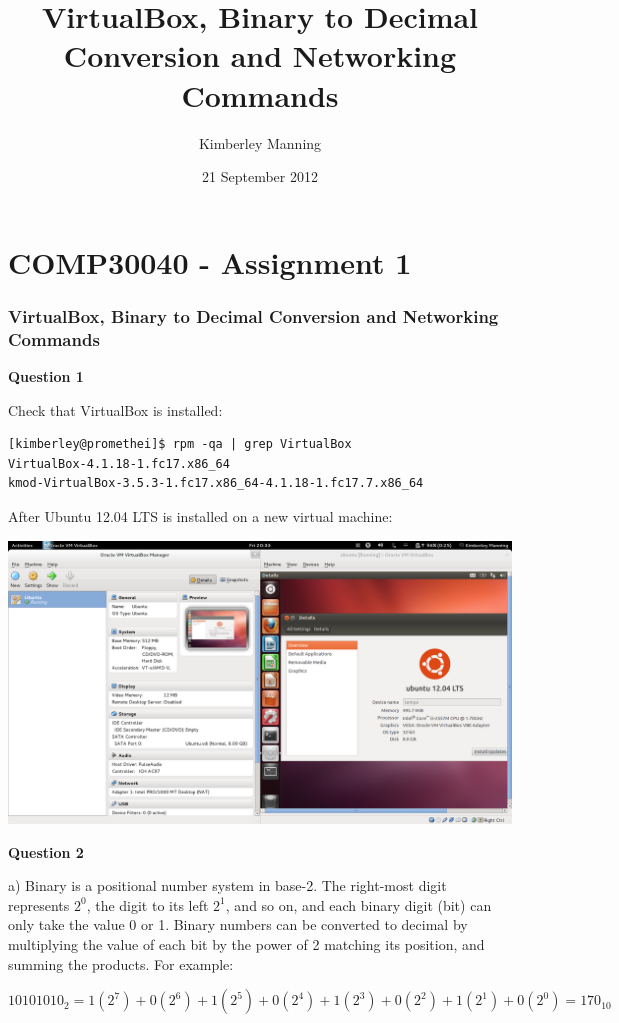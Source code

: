 \documentclass[a4paper,12pt]{report}
\begin{document}
\title{VirtualBox, Binary to Decimal Conversion and Networking Commands}
\author{Kimberley Manning}
\date{21 September 2012}
\newpage

\section*{COMP30040 - Assignment 1}

\subsubsection*{VirtualBox, Binary to Decimal Conversion and Networking Commands}

\textbf{Question 1}

Check that VirtualBox is installed:

\begin{verbatim}
[kimberley@promethei]$ rpm -qa | grep VirtualBox
VirtualBox-4.1.18-1.fc17.x86_64
kmod-VirtualBox-3.5.3-1.fc17.x86_64-4.1.18-1.fc17.7.x86_64
\end{verbatim}

After Ubuntu 12.04 LTS is installed on a new virtual machine:

\includegraphics[width=\textwidth]{virtualbox-setup.png}

\textbf{Question 2}

a) Binary is a positional number system in base-2. The right-most digit represents $2^0$, the digit to its left $2^1$, and so on, and each binary digit (bit) can only take the value 0 or 1. Binary numbers can be converted to decimal by multiplying the value of each bit by the power of 2 matching its position, and summing the products. For example:

$10101010_2 = 1(2^7)+0(2^6)+1(2^5)+0(2^4)+1(2^3)+0(2^2)+1(2^1)+0(2^0) = 170_{10}$
\end{document}
